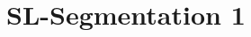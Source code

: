 \documentclass{article}
\begin{document}
\thispagestyle{empty}
\printtitle									%
  	\vfill
\printauthor
\newpage

\tableofcontents
\thispagestyle{empty}
\newpage
\def\BU{SL}
\def\SegmentOne{1}
\newcommand\SegmentsOneComponent{SL, DCorporate, DEquity, Government, IEquity,
IFI, Other}

\section{\BU-Segmentation 1}
	
	
\CleanUp
\end{document}
